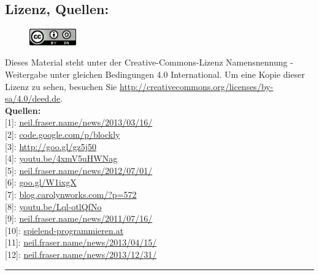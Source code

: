 \documentclass[10pt,a4paper,ngerman,twoside]{article} %
\newcommand{\SepRule}{\noindent	%
\begin{center}
\rule{250pt}{1pt} %
\end{center}
}
\begin{document}
\begin{multicols}{3}
\subsection*{Lizenz, Quellen:}
\begin{figure}
\includegraphics[width=2cm]{vietnam/ccbysa88x31.png}
\end{figure}
Dieses Material steht unter der Creative-Commons-Lizenz Namensnennung - Weitergabe unter gleichen Bedingungen 4.0 International. Um eine Kopie dieser Lizenz zu sehen, besuchen Sie \url{http://creativecommons.org/licenses/by-sa/4.0/deed.de}. \\

\textbf{Quellen:} \\
{[}1{]}: \href{https://neil.fraser.name/news/2013/03/16/}{neil.fraser.name/news/2013/03/16/} \\
{[}2{]}: \href{https://code.google.com/p/blockly/}{code.google.com/p/blockly} \\
{[}3{]}: \href{https://blockly-demo.appspot.com/static/apps/index.html?lang=de}{http://goo.gl/gz5j50} \\
{[}4{]}: \href{http://www.youtube.com/watch?v=4xmV5uHWNag}{youtu.be/4xmV5uHWNag} \\
{[}5{]}: \href{http://neil.fraser.name/news/2012/07/01/}{neil.fraser.name/news/2012/07/01/} \\
{[}6{]}: \href{http://www.marylandpublicschools.org/MSDE/programs/esea/docs/TQ_Regulations/core_subjects.htm}{goo.gl/W1ixgX} \\
{[}7{]}: \href{http://blog.carolynworks.com/?p=572}{blog.carolynworks.com/?p=572} \\
{[}8{]}: \href{http://youtu.be/Lql-otlQfNo}{youtu.be/Lql-otlQfNo} \\
{[}9{]}: \href{https://neil.fraser.name/news/2011/07/16/}{neil.fraser.name/news/2011/07/16/} \\
{[}10{]}: \href{http://spielend-programmieren.at}{spielend-programmieren.at} \\
{[}11{]}: \href{https://neil.fraser.name/news/2013/04/15/}{neil.fraser.name/news/2013/04/15/} \\
{[}12{]}: \href{https://neil.fraser.name/news/2013/12/31/}{neil.fraser.name/news/2013/12/31/} \\
\end{multicols}
\SepRule
\end{document}

